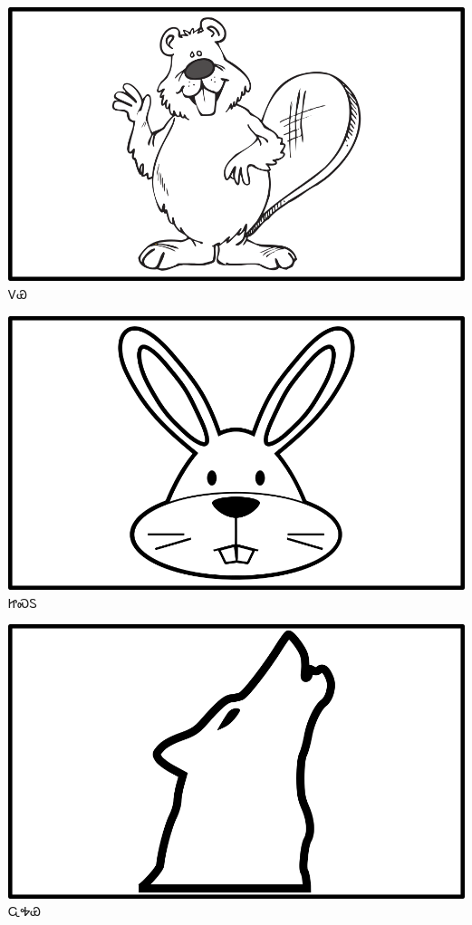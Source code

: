 \documentclass[avery5371]{flashcards}%
\begin{document}
\begin{flashcard}{
\includegraphics[width=0.95\columnwidth,height=.51\columnwidth,keepaspectratio]{../artwork/objects-animate/doya}
}
\Huge ᏙᏯ
\end{flashcard}

\begin{flashcard}{
\includegraphics[width=0.95\columnwidth,height=.51\columnwidth,keepaspectratio]{../artwork/objects-animate/jisdu}
}
\Huge ᏥᏍᏚ
\end{flashcard}
\begin{flashcard}{
\includegraphics[width=0.95\columnwidth,height=.51\columnwidth,keepaspectratio]{../artwork/objects-animate/wahya}
}
\Huge ᏩᎭᏯ
\end{flashcard}
\end{document}
